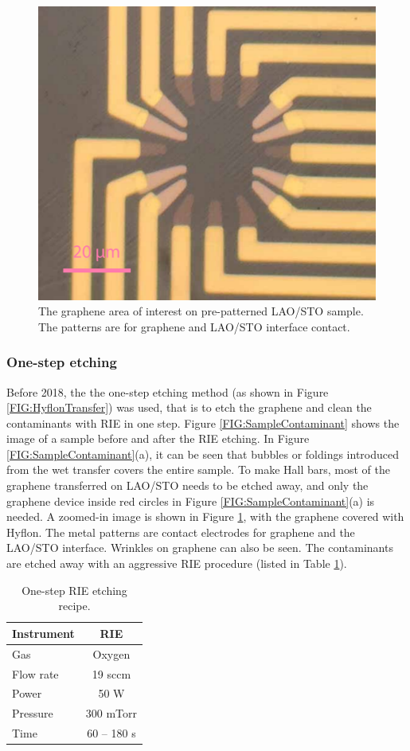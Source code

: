 \documentclass[pdflatex, sectionletters, 12pt, final, phd]{pittetd}    %
\begin{document}
\begin{figure}[h!]
	\centering
	\includegraphics[width=.5\textwidth]{Drawing/RIEBeforeEtching.pdf}
	\caption[The graphene area of interest on pre-patterned LAO/STO sample]{The graphene area of interest on pre-patterned LAO/STO sample. The patterns are for graphene and LAO/STO interface contact.}
	\label{FIG:RIEBeforeEtching}
\end{figure}

\subsubsection{One-step etching}

Before 2018, the the one-step etching method (as shown in Figure \ref{FIG:HyflonTransfer}) was used, that is to etch the graphene and clean the contaminants with RIE in one step. Figure \ref{FIG:SampleContaminant} shows the image of a sample before and after the RIE etching. In Figure \ref{FIG:SampleContaminant}(a), it can be seen that bubbles or foldings introduced from the wet transfer covers the entire sample. To make Hall bars, most of the graphene transferred on LAO/STO needs to be etched away, and only the graphene device inside red circles in Figure \ref{FIG:SampleContaminant}(a) is needed. A zoomed-in image is shown in Figure \ref{FIG:RIEBeforeEtching}, with the graphene covered with Hyflon. The metal patterns are contact electrodes for graphene and the LAO/STO interface. Wrinkles on graphene can also be seen. The contaminants are etched away with an aggressive RIE procedure (listed in Table \ref{TAB:RIESingleStep}). 

\begin{table}
	\centering
	\begin{tabular}{l|c}
		\hline
		Instrument    & RIE \\ \hline
		Gas    &    Oxygen \\ 
		Flow rate    &    19 sccm    \\ 
		Power & 50 W \\
		Pressure    &    300 mTorr    \\
		Time    &    60 -- 180 s \\ \hline
	\end{tabular}
	\caption{One-step RIE etching recipe.}
	\label{TAB:RIESingleStep}
\end{table}
\end{document}
